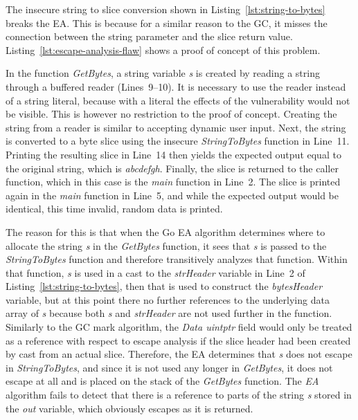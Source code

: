The insecure string to slice conversion shown in Listing~\ref{lst:string-to-bytes} breaks the \acrshort{EA}.
This is because for a similar reason to the \acrshort{GC}, it misses the connection between the string parameter and
the slice return value.
Listing~\ref{lst:escape-analysis-flaw} shows a proof of concept of this problem.



In the function \textit{GetBytes}, a string variable \textit{s} is created by reading a string through a buffered
reader (Lines~9--10).
It is necessary to use the reader instead of a string literal, because with a literal the effects of the vulnerability
would not be visible.
This is however no restriction to the proof of concept.
Creating the string from a reader is similar to accepting dynamic user input.
Next, the string is converted to a byte slice using the insecure \textit{StringToBytes} function in Line~11.
Printing the resulting slice in Line~14 then yields the expected output equal to the original string, which is
\textit{abcdefgh}.
Finally, the slice is returned to the caller function, which in this case is the \textit{main} function in Line~2.
The slice is printed again in the \textit{main} function in Line~5, and while the expected output would be identical,
this time invalid, random data is printed.

The reason for this is that when the Go \acrshort{EA} algorithm determines where to allocate the string \textit{s} in
the \textit{GetBytes} function, it sees that \textit{s} is passed to the \textit{StringToBytes} function and therefore
transitively analyzes that function.
Within that function, \textit{s} is used in a cast to the \textit{strHeader} variable in Line~2 of
Listing~\ref{lst:string-to-bytes}, then that is used to construct the \textit{bytesHeader} variable, but at this point
there no further references to the underlying data array of \textit{s} because both \textit{s} and
\textit{strHeader} are not used further in the function.
Similarly to the \acrshort{GC} mark algorithm, the \textit{Data uintptr} field would only be treated as a reference with
respect to escape analysis if the slice header had been created by cast from an actual slice.
Therefore, the \acrshort{EA} determines that \textit{s} does not escape in \textit{StringToBytes}, and since it is not
used any longer in \textit{GetBytes}, it does not escape at all and is placed on the stack of the \textit{GetBytes}
function.
The \textit{EA} algorithm fails to detect that there is a reference to parts of the string \textit{s} stored in the
\textit{out} variable, which obviously escapes as it is returned.

